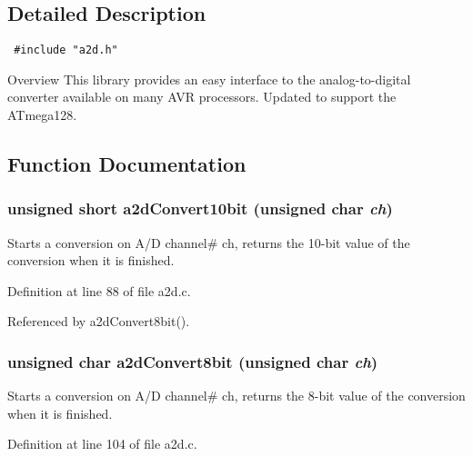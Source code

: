 \subsection{Detailed Description}


\begin{Code}\begin{verbatim} #include "a2d.h" 
\end{verbatim}
\end{Code}

 \begin{Desc}
\item[Overview]This library provides an easy interface to the analog-to-digital converter available on many AVR processors. Updated to support the ATmega128. \end{Desc}


\subsection{Function Documentation}
\hypertarget{group__a2d_ga7361811ca4e813838865bd87bf8e017}{
\subsubsection[{a2dConvert10bit}]{\setlength{\rightskip}{0pt plus 5cm}unsigned short a2dConvert10bit (unsigned char {\em ch})}}
\label{group__a2d_ga7361811ca4e813838865bd87bf8e017}


Starts a conversion on A/D channel\# ch, returns the 10-bit value of the conversion when it is finished. 

Definition at line 88 of file a2d.c.

Referenced by a2dConvert8bit().\hypertarget{group__a2d_gcc741350aaf6fdd70153838bf22ded02}{
\subsubsection[{a2dConvert8bit}]{\setlength{\rightskip}{0pt plus 5cm}unsigned char a2dConvert8bit (unsigned char {\em ch})}}
\label{group__a2d_gcc741350aaf6fdd70153838bf22ded02}


Starts a conversion on A/D channel\# ch, returns the 8-bit value of the conversion when it is finished. 

Definition at line 104 of file a2d.c.

